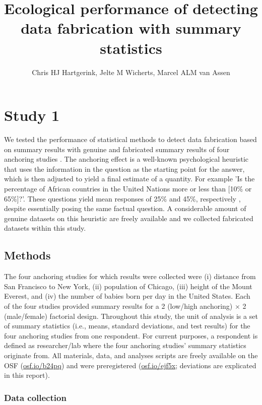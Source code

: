 \documentclass{article}
\title{Ecological performance of detecting data fabrication with summary statistics}
\author{Chris HJ Hartgerink, Jelte M Wicherts, Marcel ALM van Assen}
\begin{document}

\maketitle


\section*{Study 1}


We tested the performance of statistical methods to detect data fabrication based on summary results with genuine and fabricated summary results of four anchoring studies \citep{tversky1974,jacowitz1995}. The anchoring effect is a well-known psychological heuristic that uses the information in the question as the starting point for the answer, which is then adjusted to yield a final estimate of a quantity. For example 'Is the percentage of African countries in the United Nations more or less than [10\% or 65\%]?'. These questions yield mean responses of 25\% and 45\%, respectively \citep{tversky1974}, despite essentially posing the same factual question. A considerable amount of genuine datasets on this heuristic are freely available and we collected fabricated datasets within this study.

\subsection*{Methods}

The four anchoring studies for which results were collected were (i) distance from San Francisco to New York, (ii) population of Chicago, (iii) height of the Mount Everest, and (iv) the number of babies born per day in the United States. Each of the four studies provided summary results for a 2 (low/high anchoring) $\times$ 2 (male/female) factorial design. Throughout this study, the unit of analysis is a set of summary statistics (i.e., means, standard deviations, and test results) for the four anchoring studies from one respondent. For current purposes, a respondent is defined as researcher/lab where the four anchoring studies' summary statistics originate from. All materials, data, and analyses scripts are freely available on the OSF (\url{osf.io/b24pq}) and were preregistered (\url{osf.io/ejf5x}; deviations are explicated in this report).

\subsubsection*{Data collection}
\end{document}
